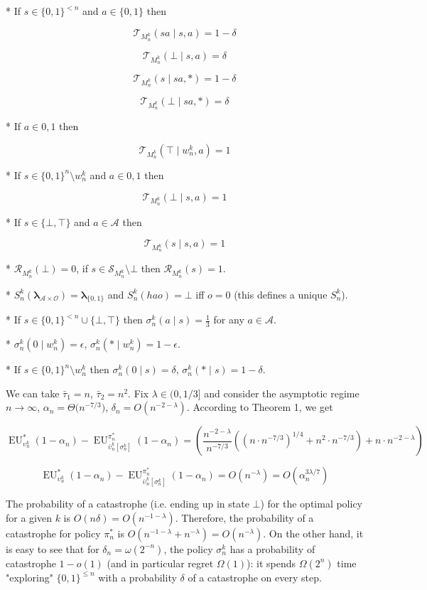 \documentclass[a4paper]{article}
\newcommand{\Bool}{\{0,1\}}
\newcommand{\AP}[1]{\left(#1\right)}
\newcommand{\AB}[1]{\left[#1\right]}
\newcommand{\Estr}{\boldsymbol{\lambda}}
\newcommand{\Ob}{\mathcal{O}}
\newcommand{\A}{\mathcal{A}}
\newcommand{\St}{\mathcal{S}}
\newcommand{\T}{\mathcal{T}}
\newcommand{\R}{\mathcal{R}}
\newcommand{\EU}{\operatorname{EU}}
\begin{document}
* If $s \in \Bool^{< n}$ and $a \in \Bool$ then 

$$\T_{M_n^k}(sa \mid s,a) = 1 - \delta$$

$$\T_{M_n^k}(\bot \mid s,a) = \delta$$

$$\T_{M_n^k}(s \mid sa,*) = 1 - \delta$$

$$\T_{M_n^k}(\bot \mid sa,*) = \delta$$

* If $a \in {0,1}$ then

$$\T_{M_n^k}(\top \mid w_n^k,a) = 1$$

* If $s \in \Bool^n \setminus w_n^k$ and $a \in {0,1}$ then

$$\T_{M_n^k}(\bot \mid s,a) = 1$$

* If $s \in \{\bot,\top\}$ and $a \in \A$ then

$$\T_{M_n^k}(s \mid s,a) = 1$$

* $\R_{M_n^k}(\bot)=0$, if $s \in \St_{M_n^k} \setminus \bot$ then $\R_{M_n^k}(s)=1$.

* $S_n^k(\Estr_{\A \times \Ob})=\Estr_{\Bool}$ and $S_n^k(hao)=\bot$ iff $o = 0$ (this defines a unique $S_n^k$).

* If $s \in \Bool^{<n} \cup \{\bot,\top\}$ then $\sigma_n^k(a \mid s) = \frac{1}{3}$ for any $a \in \A$.

* $\sigma_n^k(0 \mid w_n^k) = \epsilon$, $\sigma_n^k(* \mid w_n^k) = 1 - \epsilon$.

* If $s \in \Bool^n \setminus w_n^k$ then $\sigma_n^k(0 \mid s) = \delta$, $\sigma_n^k(* \mid s) = 1 - \delta$.

We can take $\bar{\tau}_1 = n$, $\bar{\tau}_2 = n^2$. Fix $\lambda \in (0,1/3]$ and consider the asymptotic regime $n \rightarrow \infty$, $\alpha_n = \Theta\Big(n^{-7/3}\Big)$, $\delta_n = O\AP{n^{-2-\lambda}}$. According to Theorem 1, we get

$$\EU_{\upsilon_n^k}^*(1-\alpha_n) - \EU_{\bar{\upsilon}_n^k\AB{\sigma_n^k}}^{\pi_n^*}(1-\alpha_n) = \AP{\frac{n^{-2-\lambda}}{n^{-7/3}}\AP{\AP{n \cdot n^{-7/3}}^{1/4}+n^2 \cdot n^{-7/3}}+n \cdot n^{-2-\lambda}}$$

$$\EU_{\upsilon_n^k}^*(1-\alpha_n) - \EU_{\bar{\upsilon}_n^k\AB{\sigma_n^k}}^{\pi_n^*}(1-\alpha_n) = O\AP{n^{-\lambda}}=O\AP{\alpha_n^{3\lambda/7}}$$

The probability of a catastrophe (i.e. ending up in state $\bot$) for the optimal policy for a given $k$ is $O\AP{n\delta}=O\AP{n^{-1-\lambda}}$. Therefore, the probability of a catastrophe for policy $\pi_n^*$ is $O\AP{n^{-1-\lambda}+n^{-\lambda}}=O\AP{n^{-\lambda}}$. On the other hand, it is easy to see that for $\delta_n = \omega\AP{2^{-n}}$, the policy $\sigma_n^k$ has a probability of catastrophe $1-o(1)$ (and in particular  regret $\Omega(1)$): it spends $\Omega(2^n)$ time "exploring" $\Bool^{\leq n}$ with a probability $\delta$ of a catastrophe on every step.
\end{document}
